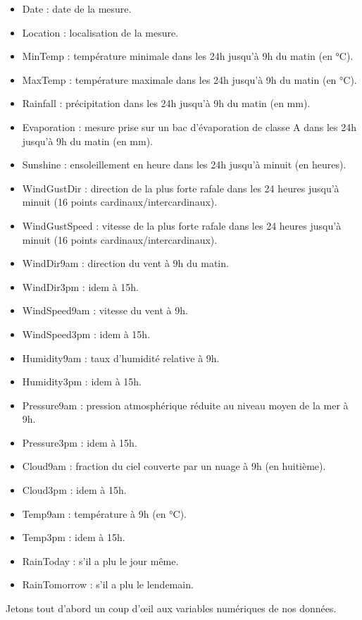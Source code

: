 \documentclass{article}
\begin{document}
\begin{itemize}
    \item Date : date de la mesure.
    \item Location : localisation de la mesure.
    \item MinTemp : température minimale dans les 24h jusqu'à 9h du matin (en °C).
    \item MaxTemp : température maximale dans les 24h jusqu'à 9h du matin (en °C).
    \item Rainfall : précipitation dans les 24h jusqu'à 9h du matin (en mm).
    \item Evaporation : mesure prise sur un bac d'évaporation de classe A dans les 24h jusqu'à 9h du matin (en mm).
    \item Sunshine : ensoleillement en heure dans les 24h jusqu'à minuit (en heures).
    \item WindGustDir : direction de la plus forte rafale dans les 24 heures jusqu'à minuit (16 points cardinaux/intercardinaux).   
    \item WindGustSpeed : vitesse de la plus forte rafale dans les 24 heures jusqu'à minuit (16 points cardinaux/intercardinaux).
    \item WindDir9am : direction du vent à 9h du matin.
    \item WindDir3pm : idem à 15h.
    \item WindSpeed9am : vitesse du vent à 9h.
    \item WindSpeed3pm : idem à 15h.
    \item Humidity9am : taux d'humidité relative à 9h.
    \item Humidity3pm : idem à 15h.
    \item Pressure9am : pression atmosphérique réduite au niveau moyen de la mer à 9h.
    \item Pressure3pm : idem à 15h.
    \item Cloud9am : fraction du ciel couverte par un nuage à 9h (en huitième).   
    \item Cloud3pm : idem à 15h.
    \item Temp9am : température à 9h (en °C).
    \item Temp3pm : idem à 15h.
    \item RainToday : s'il a plu le jour même.
    \item RainTomorrow : s'il a plu le lendemain.   
\end{itemize}
Jetons tout d'abord un coup d'œil aux variables numériques de nos données. 
\end{document}
